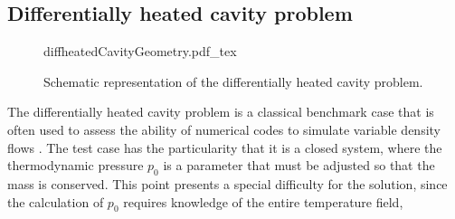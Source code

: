 \subsection{Differentially heated cavity problem}\label{ss:DHC}
\begin{figure}[bt]
	\begin{center}
		\def\svgwidth{0.53\textwidth}
		{diffheatedCavityGeometry.pdf_tex}
		\caption{Schematic representation of the differentially heated cavity problem.}
		\label{DHCGeom}
	\end{center}
\end{figure}
The differentially heated cavity problem is a classical benchmark case that is often used to assess the ability of numerical codes to simulate variable density flows \citep{paillereComparisonLowMach2000,vierendeelsBenchmarkSolutionsNatural2003,tyliszczakProjectionMethodHighorder2014}.
The test case has the particularity that it is a closed system, where the thermodynamic pressure $p_0$ is a parameter that must be adjusted so that the mass is conserved. This point presents a special difficulty for the solution, since the calculation of $p_0$ requires knowledge of the entire temperature field, 

